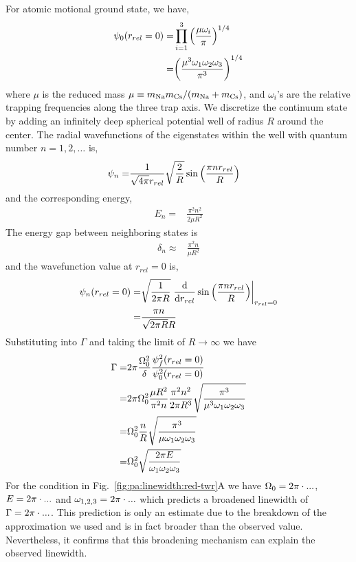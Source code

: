For atomic motional ground state, we have,
\begin{align*}
  \psi_0\paren{r_{rel}=0}=&\prod_{i=1}^{3}\paren{\frac{\mu\omega_i}{\pi}}^{1/4}\\
  =&\paren{\frac{\mu^3\omega_1\omega_2\omega_3}{\pi^3}}^{1/4}
\end{align*}
where $\mu$ is the reduced mass $\mu\equiv m_\Na m_\Cs/\paren{m_\Na+m_\Cs}$,
and $\omega_i$'s are the relative trapping frequencies along the three trap axis.
We discretize the continuum state by adding an infinitely deep spherical potential well
of radius $R$ around the center. The radial wavefunctions of the eigenstates
within the well with quantum number $n=1,2,\dots$ is,
\begin{align*}
  \psi_n=&\frac{1}{\sqrt{4\pi}r_{rel}}\sqrt{\frac{2}{R}}\sin\paren{\frac{\pi nr_{rel}}{R}}
\end{align*}
and the corresponding energy,
\begin{align*}
  E_n=&\frac{\pi^2n^2}{2\mu R^2}
\end{align*}
The energy gap between neighboring states is
\begin{align*}
  \delta_n\approx&\frac{\pi^2n}{\mu R^2}
\end{align*}
and the wavefunction value at $r_{rel}=0$ is,
\begin{align*}
  \psi_n\paren{r_{rel}=0}=&\sqrt{\frac{1}{2\pi R}}\left.\frac{\ud}{\ud r_{rel}}\sin\paren{\frac{\pi nr_{rel}}{R}}\right|_{r_{rel}=0}\\
  =&\frac{\pi n}{\sqrt{2\pi R}R}
\end{align*}
Substituting into $\Gamma$ and taking the limit of $R\rightarrow\infty$ we have
\begin{align*}
  \Gamma=&2\pi\frac{\Omega_0^2}{\delta}\frac{\psi_f^2\paren{r_{rel}=0}}{\psi_0^2\paren{r_{rel}=0}}\\
  =&2\pi\Omega_0^2\frac{\mu R^2}{\pi^2n}\frac{\pi^2 n^2}{2\pi R^3}\sqrt{\frac{\pi^3}{\mu^3\omega_1\omega_2\omega_3}}\\
  =&\Omega_0^2\frac{n}{R}\sqrt{\frac{\pi^3}{\mu\omega_1\omega_2\omega_3}}\\
  =&\Omega_0^2\sqrt{\frac{2\pi E}{\omega_1\omega_2\omega_3}}
\end{align*}
For the condition in Fig.~\ref{fig:pa:linewidth:red-twr}A
we have $\Omega_0=2\pi\cdot\todo{number}...$,
$E=2\pi\cdot\todo{number}...$ and $\omega_{1,2,3}=2\pi\cdot\todo{number}...$
which predicts a broadened linewidth of $\Gamma=2\pi\cdot\todo{number}...$.
This prediction is only an estimate due to the breakdown of the approximation
we used and is in fact broader than the observed value.
Nevertheless, it confirms that this broadening mechanism can explain the observed linewidth.

